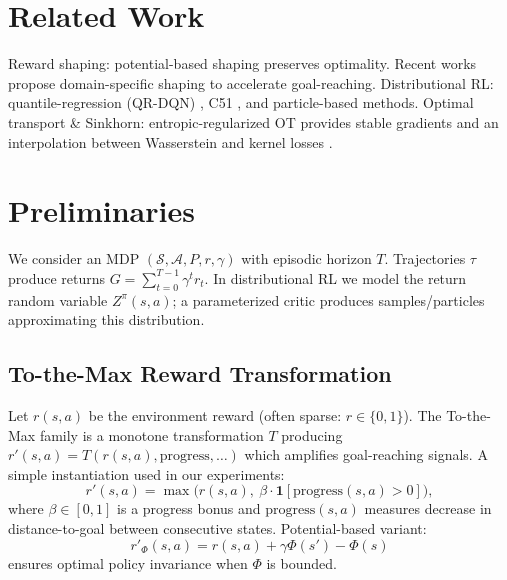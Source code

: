 \documentclass[10pt,twocolumn]{article}
\begin{document}
\section{Related Work}
Reward shaping: potential-based shaping \cite{ng1999policy} preserves optimality. Recent works propose domain-specific shaping to accelerate goal-reaching. Distributional RL: quantile-regression (QR-DQN) \cite{dabney2018distributional}, C51 \cite{bellemare2017distributional}, and particle-based methods. Optimal transport & Sinkhorn: entropic-regularized OT provides stable gradients and an interpolation between Wasserstein and kernel losses \cite{feydy2019interpolating}.

\section{Preliminaries}
We consider an MDP $(\mathcal{S},\mathcal{A},P,r,\gamma)$ with episodic horizon $T$. Trajectories $\tau$ produce returns $G=\sum_{t=0}^{T-1}\gamma^t r_t$. In distributional RL we model the return random variable $Z^\pi(s,a)$; a parameterized critic produces samples/particles approximating this distribution.

\subsection{To-the-Max Reward Transformation}
Let $r(s,a)$ be the environment reward (often sparse: $r\in\{0,1\}$). The To-the-Max family is a monotone transformation $T$ producing $r'(s,a)=T(r(s,a),\text{progress},\ldots)$ which amplifies goal-reaching signals. A simple instantiation used in our experiments:
\begin{equation}
r'(s,a) = \max\big(r(s,a),\ \beta\cdot \mathbf{1}[\text{progress}(s,a)>0]\big),
\label{eq:to_max}
\end{equation}
where $\beta\in[0,1]$ is a progress bonus and $\text{progress}(s,a)$ measures decrease in distance-to-goal between consecutive states. Potential-based variant:
\begin{equation}
r'_{\Phi}(s,a) = r(s,a) + \gamma\Phi(s') - \Phi(s)
\label{eq:potential_shaping}
\end{equation}
ensures optimal policy invariance \cite{ng1999policy} when $\Phi$ is bounded.
\end{document}
